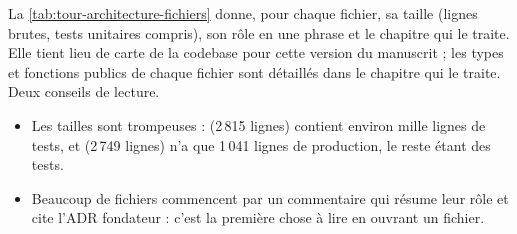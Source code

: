 La \cref{tab:tour-architecture-fichiers} donne, pour chaque fichier, sa taille (lignes brutes, tests unitaires compris), son rôle en une phrase et le chapitre qui le traite. Elle tient lieu de carte de la codebase pour cette version du manuscrit ; les types et fonctions publics de chaque fichier sont détaillés dans le chapitre qui le traite. Deux conseils de lecture.
\begin{itemize}
  \item Les tailles sont trompeuses :  (2\,815 lignes) contient environ mille lignes de tests, et  (2\,749 lignes) n'a que 1\,041 lignes de production, le reste étant des tests.
  \item Beaucoup de fichiers commencent par un commentaire \code{//!} qui résume leur rôle et cite l'ADR fondateur : c'est la première chose à lire en ouvrant un fichier.
\end{itemize}

